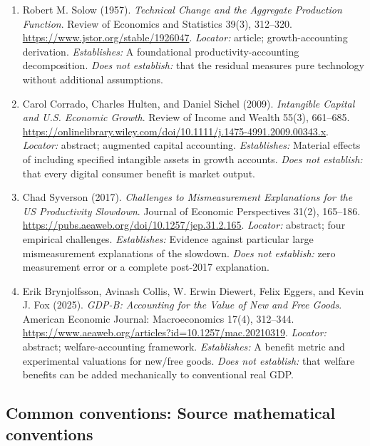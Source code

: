 \documentclass[11pt,a4paper]{article}
\begin{document}
\begin{enumerate}

\item[S1] Robert M. Solow (1957). \emph{Technical Change and the Aggregate Production Function}. Review of Economics and Statistics 39(3), 312--320. \url{https://www.jstor.org/stable/1926047}. \textit{Locator:} article; growth-accounting derivation. \textit{Establishes:} A foundational productivity-accounting decomposition. \textit{Does not establish:} that the residual measures pure technology without additional assumptions.

\item[S2] Carol Corrado, Charles Hulten, and Daniel Sichel (2009). \emph{Intangible Capital and U.S. Economic Growth}. Review of Income and Wealth 55(3), 661--685. \url{https://onlinelibrary.wiley.com/doi/10.1111/j.1475-4991.2009.00343.x}. \textit{Locator:} abstract; augmented capital accounting. \textit{Establishes:} Material effects of including specified intangible assets in growth accounts. \textit{Does not establish:} that every digital consumer benefit is market output.

\item[S3] Chad Syverson (2017). \emph{Challenges to Mismeasurement Explanations for the US Productivity Slowdown}. Journal of Economic Perspectives 31(2), 165--186. \url{https://pubs.aeaweb.org/doi/10.1257/jep.31.2.165}. \textit{Locator:} abstract; four empirical challenges. \textit{Establishes:} Evidence against particular large mismeasurement explanations of the slowdown. \textit{Does not establish:} zero measurement error or a complete post-2017 explanation.

\item[S4] Erik Brynjolfsson, Avinash Collis, W. Erwin Diewert, Felix Eggers, and Kevin J. Fox (2025). \emph{GDP-B: Accounting for the Value of New and Free Goods}. American Economic Journal: Macroeconomics 17(4), 312--344. \url{https://www.aeaweb.org/articles?id=10.1257/mac.20210319}. \textit{Locator:} abstract; welfare-accounting framework. \textit{Establishes:} A benefit metric and experimental valuations for new/free goods. \textit{Does not establish:} that welfare benefits can be added mechanically to conventional real GDP.

\end{enumerate}

\subsection*{Common conventions: Source mathematical conventions}
\end{document}
